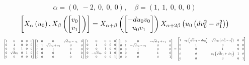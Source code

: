 \documentclass[11pt]{article}
\theoremstyle{definition}
\begin{document}
\[
\alpha = \left( 0, \  -2, \  0, \  0, \  0\right), \quad \beta = \left( 1, \  1, \  0, \  0, \  0\right)
\]
\[
\scaletoalign{\textwidth}{\left[ X_{\alpha}\left(u_{0}\right), X_{\beta}\left(\left[\begin{matrix}v_{0}\\v_{1}\end{matrix}\right]\right) \right] = X_{\alpha + \beta}\left(\left[\begin{matrix}- d u_{0} v_{0}\\u_{0} v_{1}\end{matrix}\right]\right) X_{\alpha + 2\beta}\left(u_{0} \left(d v_{0}^{2} - v_{1}^{2}\right)\right)}
\]
\[
\scaletoalign{\textwidth}{{\left[\begin{matrix}1 & 0 & 0 & 0 & 0\\0 & 1 & 0 & 0 & 0\\0 & 0 & 1 & 0 & 0\\0 & \sqrt{d} u_{0} & 0 & 1 & 0\\0 & 0 & 0 & 0 & 1\end{matrix}\right]} {\left[\begin{matrix}1 & 0 & 0 & \sqrt{d} v_{0} - v_{1} & 0\\0 & 1 & \sqrt{d} v_{0} + v_{1} & 0 & 0\\0 & 0 & 1 & 0 & 0\\0 & 0 & 0 & 1 & 0\\0 & 0 & 0 & 0 & 1\end{matrix}\right]} {\left[\begin{matrix}1 & 0 & 0 & 0 & 0\\0 & 1 & 0 & 0 & 0\\0 & 0 & 1 & 0 & 0\\0 & - \sqrt{d} u_{0} & 0 & 1 & 0\\0 & 0 & 0 & 0 & 1\end{matrix}\right]} {\left[\begin{matrix}1 & 0 & 0 & - \sqrt{d} v_{0} + v_{1} & 0\\0 & 1 & - \sqrt{d} v_{0} - v_{1} & 0 & 0\\0 & 0 & 1 & 0 & 0\\0 & 0 & 0 & 1 & 0\\0 & 0 & 0 & 0 & 1\end{matrix}\right]} = {\left[\begin{matrix}1 & u_{0} \left(\sqrt{d} v_{1} - d v_{0}\right) & \sqrt{d} u_{0} \left(d v_{0}^{2} - v_{1}^{2}\right) & 0 & 0\\0 & 1 & 0 & 0 & 0\\0 & 0 & 1 & 0 & 0\\0 & 0 & u_{0} \left(\sqrt{d} v_{1} + d v_{0}\right) & 1 & 0\\0 & 0 & 0 & 0 & 1\end{matrix}\right]}}
\]
\end{document}
